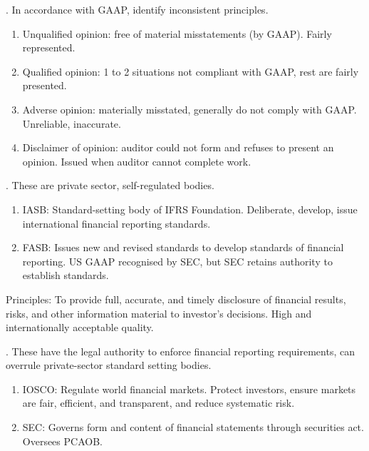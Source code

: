 \begin{remark} . In accordance with GAAP, identify inconsistent principles.
\begin{enumerate}[label=\roman*.]
\setlength{\itemsep}{0pt}
\item Unqualified opinion: free of material misstatements (by GAAP). Fairly represented.
\item Qualified opinion: 1 to 2 situations not compliant with GAAP, rest are fairly presented.
\item Adverse opinion: materially misstated, generally do not comply with GAAP. Unreliable, inaccurate.
\item Disclaimer of opinion: auditor could not form and refuses to present an opinion. Issued when auditor cannot complete work.
\end{enumerate}
\end{remark}

\begin{remark} . These are private sector, self-regulated bodies.
\begin{enumerate}[label=\roman*.]
\setlength{\itemsep}{0pt}
\item IASB: Standard-setting body of IFRS Foundation. Deliberate, develop, issue international financial reporting standards.
\item FASB: Issues new and revised standards to develop standards of financial reporting.  US GAAP recognised by SEC, but SEC retains authority to establish standards.
\end{enumerate}
Principles: To provide full, accurate, and timely disclosure of financial results, risks, and other information material to investor’s decisions. High and internationally acceptable quality.
\end{remark}

\begin{remark} . These have the legal authority to enforce financial reporting requirements, can overrule private-sector standard setting bodies.
\begin{enumerate}[label=\roman*.]
\setlength{\itemsep}{0pt}
\item IOSCO: Regulate world financial markets. Protect investors, ensure markets are fair, efficient, and transparent, and reduce systematic risk.
\item SEC: Governs form and content of financial statements through securities act. Oversees PCAOB.
\end{enumerate}
\end{remark}

